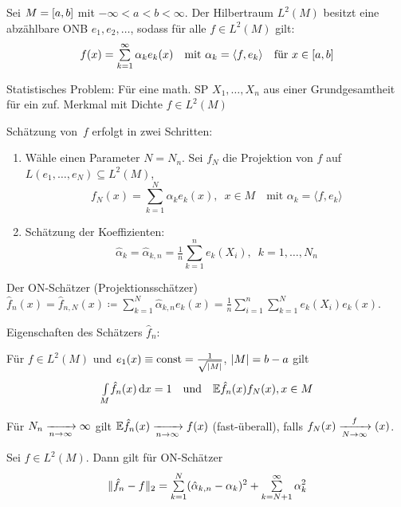 \documentclass{cheat-sheet}
\newcommand{\E}{\mathbb{E}} %
\newcommand{\scp}[2]{\langle #1, #2 \rangle} %
\begin{document}

Sei $M = \left[ a, b \right]$ mit $- \infty < a < b < \infty$.
Der Hilbertraum $L^2(M)$ besitzt eine abzählbare ONB $e_1, e_2, \ldots$, sodass für alle $f \in L^2(M)$ gilt:
\[
  f(x) = \sum_{k=1}^\infty \alpha_k e_k(x)
  \quad \text{mit } \alpha_k = \scp{f}{e_k}
  \quad \text{für } x \in \cinterval{a}{b}
\]

Statistisches Problem: Für eine math. SP $X_1, \ldots, X_n$ aus einer Grundgesamtheit für ein zuf. Merkmal mit Dichte $f \in L^2(M)$

Schätzung von~$f$ erfolgt in zwei Schritten:
\begin{enumerate}
  \item Wähle einen Parameter $N = N_n$.
  Sei $f_N$ die Projektion von $f$ auf $L(e_1, \ldots, e_N) \subseteq L^2(M)$,
  \[
    f_N(x) = \sum_{k=1}^N \alpha_k e_k(x), \enspace x \in M
    \quad \text{mit } \alpha_k = \scp{f}{e_k}
  \]
  \item Schätzung der Koeffizienten:
  \[
    \hat{\alpha}_k = \hat{\alpha}_{k,n} = \tfrac{1}{n} \sum_{k=1}^n e_k(X_i), \enspace k = 1, \ldots, N_n
  \]
\end{enumerate}
Der ON-Schätzer (Projektionsschätzer) $\hat{f}_n (x) = \hat{f}_{n,N} (x) \coloneqq \sum_{k=1}^N \hat{\alpha}_{k,n} e_k(x) = \tfrac{1}{n} \sum_{i=1}^n \sum_{k=1}^N e_k(X_i) e_k(x)$.

Eigenschaften des Schätzers $\hat{f}_n$:


\begin{lem}
  Für $f \in L^2 (M)$ und $e_1 (x) \equiv \mathrm{const} = \tfrac{1}{\sqrt{\lvert M\rvert}}$, $\lvert M\rvert = b - a$ gilt
  \[
    \Int{M}{}{\hat{f}_n(x)}{x} = 1
    \quad \text{und} \quad
    \E \hat{f}_n(x) f_N(x), x \in M
  \]
\end{lem}


\begin{kor}
  Für $N_n \xrightarrow[n \to \infty]{} \infty$ gilt $\E \hat{f}_n(x) \xra[n \to \infty]{} f(x)$ (fast-überall), falls $f_N(x) \xrightarrow[N \to \infty] f(x)$.
\end{kor}

\begin{lem}
  Sei $f \in L^2(M)$.
  Dann gilt für ON-Schätzer
  \[
    \norm{\hat{f}_n - f}_2 = \sum_{k=1}^N (\hat{\alpha}_{k,n} - \alpha_k)^2 + \sum_{k = N+1}^\infty \alpha_k^2
  \]
\end{lem}
\end{document}
